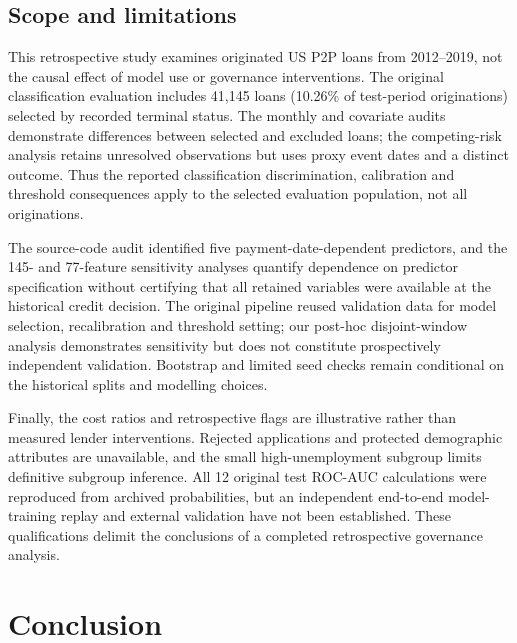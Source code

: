 \documentclass[10pt]{article}
\begin{document}
\subsection{Scope and limitations}
\label{sec:limitations}

This retrospective study examines originated US P2P loans from 2012--2019, not the causal effect of model use or governance interventions. The original classification evaluation includes 41,145 loans (10.26\% of test-period originations) selected by recorded terminal status. The monthly and covariate audits demonstrate differences between selected and excluded loans; the competing-risk analysis retains unresolved observations but uses proxy event dates and a distinct outcome. Thus the reported classification discrimination, calibration and threshold consequences apply to the selected evaluation population, not all originations.

The source-code audit identified five payment-date-dependent predictors, and the 145- and 77-feature sensitivity analyses quantify dependence on predictor specification without certifying that all retained variables were available at the historical credit decision. The original pipeline reused validation data for model selection, recalibration and threshold setting; our post-hoc disjoint-window analysis demonstrates sensitivity but does not constitute prospectively independent validation. Bootstrap and limited seed checks remain conditional on the historical splits and modelling choices.

Finally, the cost ratios and retrospective flags are illustrative rather than measured lender interventions. Rejected applications and protected demographic attributes are unavailable, and the small high-unemployment subgroup limits definitive subgroup inference. All 12 original test ROC-AUC calculations were reproduced from archived probabilities, but an independent end-to-end model-training replay and external validation have not been established. These qualifications delimit the conclusions of a completed retrospective governance analysis.

\section{Conclusion}
\end{document}
